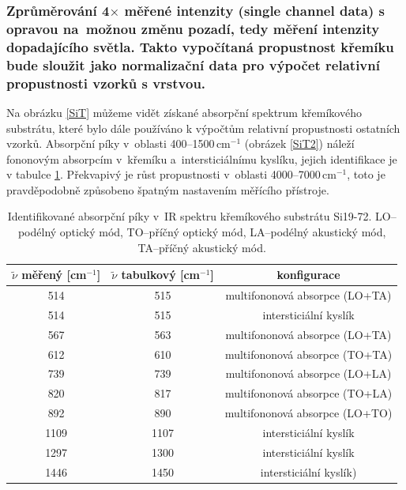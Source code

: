 \documentclass[12pt]{article}
\begin{document}
\subsubsection{Zprůměrování 4$\times$ měřené intenzity (single channel data) s opravou na~možnou změnu pozadí, tedy měření intenzity dopadajícího světla. Takto vypočítaná propustnost křemíku bude sloužit jako normalizační data pro výpočet relativní propustnosti vzorků s vrstvou. }

Na obrázku \ref{SiT} můžeme vidět získané absorpční spektrum křemíkového substrátu, které bylo dále používáno k výpočtům relativní propustnosti ostatních vzorků. Absorpční píky v~oblasti 400--1500\,cm$^{-1}$ (obrázek \ref{SiT2}) náleží fononovým absorpcím v~křemíku a~intersticiálnímu kyslíku, jejich identifikace je v tabulce \ref{SiIR}. Překvapivý je růst propustnosti v~oblasti 4000--7000\,cm$^{-1}$, toto je pravděpodobně způsobeno špatným nastavením měřícího přístroje.

\begin{table}[htbp]
\begin{center}
\begin{tabular}{|c|c|c|}
\hline
$\tilde{\nu}$ měřený [cm$^{-1}$] & $\tilde{\nu}$ tabulkový [cm$^{-1}$] & konfigurace \\ \hline
514 & 515 & multifononová absorpce (LO+TA)\\ \hline
514 & 515 & intersticiální kyslík \\ \hline
567 & 563 & multifononová absorpce (LO+TA) \\ \hline
612 & 610 & multifononová absorpce (TO+TA) \\ \hline
739 & 739 & multifononová absorpce (LO+LA) \\ \hline
820 & 817 & multifononová absorpce (TO+LA) \\ \hline
892 & 890 & multifononová absorpce (LO+TO) \\ \hline
1109 & 1107 & intersticiální kyslík \\ \hline
1297 & 1300 & intersticiální kyslík \\ \hline
1446 & 1450 & intersticiální kyslík) \\ \hline
\end{tabular}
\caption{Identifikované absorpční píky v~IR spektru křemíkového substrátu Si19-72. LO--podélný optický mód, TO--příčný optický mód, LA--podélný akustický mód, TA--příčný akustický mód.}
\label{SiIR}
\end{center}
\end{table}
\end{document}

